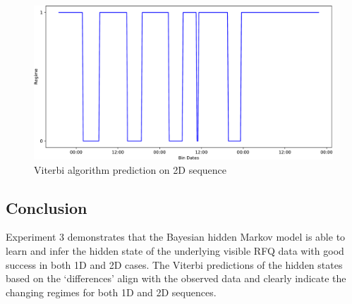 \begin{figure}[!ht]\centering
    \includegraphics[width=0.8\linewidth]{./figures/Ch4fig14}
    \caption{Viterbi algorithm prediction on 2D sequence}\label{Exp3:viterbi_pred2d}
\end{figure}


\subsection{Conclusion}

Experiment 3 demonstrates that the Bayesian hidden Markov model is able to learn and infer the hidden state of the underlying visible RFQ data with good success in both 1D and 2D cases. The Viterbi predictions of the hidden states based on the `differences' align with the observed data and clearly indicate the changing regimes for both 1D and 2D sequences.